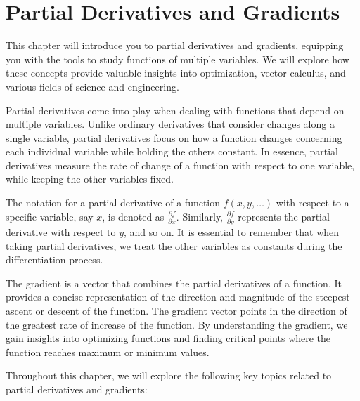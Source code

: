 \chapter{Partial Derivatives and Gradients}

This chapter will introduce you to partial derivatives and gradients,
equipping you with the tools to study functions of multiple
variables. We will explore how these concepts provide valuable
insights into optimization, vector calculus, and various fields of
science and engineering.

Partial derivatives come into play when dealing with functions that
depend on multiple variables. Unlike ordinary derivatives that
consider changes along a single variable, partial derivatives focus on
how a function changes concerning each individual variable while
holding the others constant. In essence, partial derivatives measure
the rate of change of a function with respect to one variable, while
keeping the other variables fixed.

The notation for a partial derivative of a function $f(x, y, \ldots)$
with respect to a specific variable, say $x$, is denoted as
$\frac{{\partial f}}{{\partial x}}$. Similarly, $\frac{{\partial
    f}}{{\partial y}}$ represents the partial derivative with respect
to $y$, and so on. It is essential to remember that when taking
partial derivatives, we treat the other variables as constants during
the differentiation process.

The gradient is a vector that combines the partial derivatives of a
function. It provides a concise representation of the direction and
magnitude of the steepest ascent or descent of the function. The
gradient vector points in the direction of the greatest rate of
increase of the function. By understanding the gradient, we gain
insights into optimizing functions and finding critical points where
the function reaches maximum or minimum values.

Throughout this chapter, we will explore the following key topics
related to partial derivatives and gradients:

